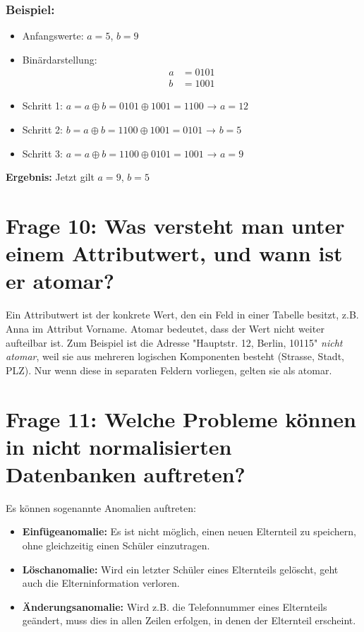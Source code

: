 \documentclass{article}
\begin{document}
\subsubsection*{Beispiel:}
\begin{itemize}
	\item Anfangswerte: \( a = 5 \), \( b = 9 \)
	\item Binärdarstellung:
	\[
	\begin{aligned}
		a &= 0101 \\
		b &= 1001
	\end{aligned}
	\]
	\item Schritt 1: \( a = a \oplus b = 0101 \oplus 1001 = 1100 \) → \( a = 12 \)
	\item Schritt 2: \( b = a \oplus b = 1100 \oplus 1001 = 0101 \) → \( b = 5 \)
	\item Schritt 3: \( a = a \oplus b = 1100 \oplus 0101 = 1001 \) → \( a = 9 \)
\end{itemize}

\textbf{Ergebnis:} Jetzt gilt \( a = 9 \), \( b = 5 \)

\section*{Frage 10: Was versteht man unter einem Attributwert, und wann ist er atomar?}
	
		Ein Attributwert ist der konkrete Wert, den ein Feld in einer Tabelle besitzt, z.B. Anna im Attribut Vorname. Atomar bedeutet, dass der Wert nicht weiter aufteilbar ist. Zum Beispiel ist die Adresse "Hauptstr. 12, Berlin, 10115" \emph{nicht atomar}, weil sie aus mehreren logischen Komponenten besteht (Strasse, Stadt, PLZ). Nur wenn diese in separaten Feldern vorliegen, gelten sie als atomar.
		
\section*{Frage 11: Welche Probleme können in nicht normalisierten Datenbanken auftreten?}

	Es können sogenannte Anomalien auftreten:
\begin{itemize}
	\item \textbf{Einfügeanomalie:} Es ist nicht möglich, einen neuen Elternteil zu speichern, ohne gleichzeitig einen Schüler einzutragen.
	\item \textbf{Löschanomalie:} Wird ein letzter Schüler eines Elternteils gelöscht, geht auch die Elterninformation verloren.
	\item \textbf{Änderungsanomalie:} Wird z.B. die Telefonnummer eines Elternteils geändert, muss dies in allen Zeilen erfolgen, in denen der Elternteil erscheint.
\end{itemize}
\end{document}
